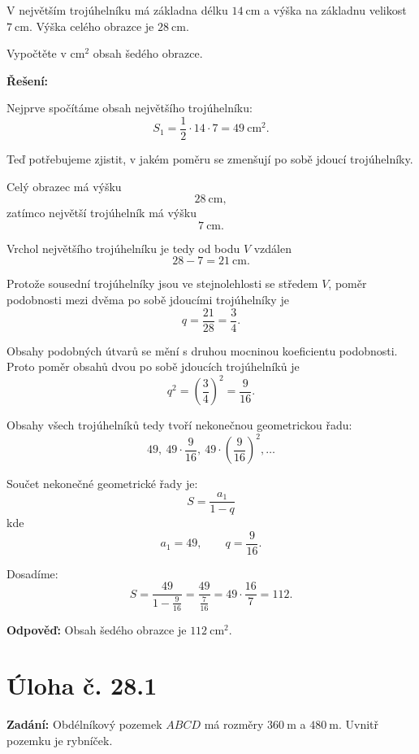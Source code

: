 \documentclass[12pt,a4paper]{article}
\begin{document}
V největším trojúhelníku má základna délku \(14\ \mathrm{cm}\) a výška na základnu velikost \(7\ \mathrm{cm}\).  
Výška celého obrazce je \(28\ \mathrm{cm}\).

Vypočtěte v \(\mathrm{cm}^2\) obsah šedého obrazce.

\bigskip

\textbf{Řešení:}

Nejprve spočítáme obsah největšího trojúhelníku:
\[
S_1=\frac{1}{2}\cdot 14 \cdot 7 = 49\ \mathrm{cm}^2.
\]

\medskip

Teď potřebujeme zjistit, v jakém poměru se zmenšují po sobě jdoucí trojúhelníky.

Celý obrazec má výšku
\[
28\ \mathrm{cm},
\]
zatímco největší trojúhelník má výšku
\[
7\ \mathrm{cm}.
\]

Vrchol největšího trojúhelníku je tedy od bodu \(V\) vzdálen
\[
28-7=21\ \mathrm{cm}.
\]

Protože sousední trojúhelníky jsou ve stejnolehlosti se středem \(V\), poměr podobnosti mezi dvěma po sobě jdoucími trojúhelníky je
\[
q=\frac{21}{28}=\frac{3}{4}.
\]

\medskip

Obsahy podobných útvarů se mění s druhou mocninou koeficientu podobnosti.  
Proto poměr obsahů dvou po sobě jdoucích trojúhelníků je
\[
q^2=\left(\frac{3}{4}\right)^2=\frac{9}{16}.
\]

Obsahy všech trojúhelníků tedy tvoří nekonečnou geometrickou řadu:
\[
49,\ 49\cdot\frac{9}{16},\ 49\cdot\left(\frac{9}{16}\right)^2,\dots
\]

Součet nekonečné geometrické řady je:
\[
S=\frac{a_1}{1-q}
\]
kde
\[
a_1=49,\qquad q=\frac{9}{16}.
\]

Dosadíme:
\[
S=\frac{49}{1-\frac{9}{16}}
=\frac{49}{\frac{7}{16}}
=49\cdot\frac{16}{7}
=112.
\]

\bigskip

\textbf{Odpověď:}  
Obsah šedého obrazce je \(112\ \mathrm{cm}^2\).



\newpage
\section*{Úloha č. 28.1}

\textbf{Zadání:}  
Obdélníkový pozemek \(ABCD\) má rozměry \(360\ \mathrm{m}\) a \(480\ \mathrm{m}\). Uvnitř pozemku je rybníček.
\end{document}
